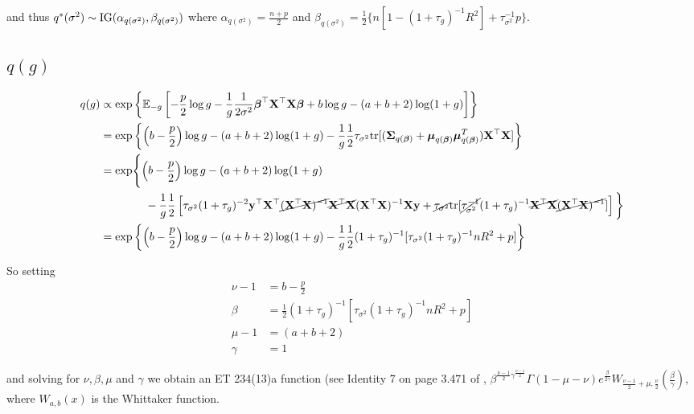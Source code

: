 \documentclass{amsart}[12pt]
\begin{document}
and thus $q^*(\sigma^2) \sim \text{IG}(\alpha_{q(\sigma^2)}, \beta_{q(\sigma^2)})$ where
$\alpha_{q(\sigma^2)} = \frac{n + p}{2}$ and $\beta_{q(\sigma^2)} = \frac{1}{2} \{n[1 - (1 + \tau_g)^{-1}  R^2] + \tau_{\sigma^2}^{-1} p \}$.

\subsection{$q(g)$}
\begin{align*}
q(g) &\propto \exp \left\{ \mathbb{E}_{-g} \left[-\frac{p}{2} \log g - \frac{1}{g} \frac{1}{2 \sigma^2} {\boldsymbol \beta}^\top {\bf X}^\top {\bf X} {\boldsymbol\beta} + b \log g - (a + b + 2) \log(1 + g) \right] \right\} \\
&= \exp \left \{ \left(b - \frac{p}{2}\right) \log g  - (a + b + 2) \log(1 + g) - \frac{1}{g} \frac{1}{2} \tau_{\sigma^2} \text{tr}[({\boldsymbol \Sigma}_{q({\boldsymbol \beta})} + {\boldsymbol \mu}_{q({\boldsymbol \beta})} {\boldsymbol \mu}_{q({\boldsymbol \beta})}^T) {\bf X}^\top {\bf X}] \right \} \\
&= \exp \Biggl \{ \left(b - \frac{p}{2}\right) \log g - (a + b + 2) \log(1 + g) \\
& \quad \quad \qquad  - \frac{1}{g} \frac{1}{2} \left[\tau_{\sigma^2} (1 + \tau_g)^{-2} {\bf y}^\top {\bf X}^\top \cancel{({\bf X}^\top {\bf X})^{-1}} \cancel{{\bf X}^\top {\bf X}} ({\bf X}^\top {\bf X})^{-1} {\bf X} {\bf y} + \cancel{\tau_{\sigma^2}} \text{tr}{[\cancel{\tau_{\sigma^2}^{-1}} (1 + \tau_g)^{-1} \cancel{{\bf X}^\top {\bf X}} \cancel{({\bf X}^\top {\bf X})^{-1}}]} \right]	\biggl \} \\
&= \exp \left \{ \left(b - \frac{p}{2}\right) \log g - (a + b + 2) \log(1 + g) - \frac{1}{g} \frac{1}{2} (1 + \tau_g)^{-1} [\tau_{\sigma^2} (1 + \tau_g)^{-1} n R^2 + p]
	  \right \}
\end{align*}

So setting
\begin{align*}
\nu - 1 &= b - \frac{p}{2} \\
\beta &= \frac{1}{2} (1 + \tau_g)^{-1} [\tau_{\sigma^2} (1 + \tau_g)^{-1} n R^2 + p] \\
\mu - 1 &= (a + b + 2) \\
\gamma &= 1
\end{align*}

and solving for $\nu, \beta, \mu$ and $\gamma$ we obtain an ET 234(13)a function (see Identity 7 on 
page 3.471 of \cite{Gradshteyn1988},
$\beta^{\frac{\nu - 1}{2} \gamma^{\frac{\nu - 1}{2}}} \Gamma(1 - \mu - \nu) e^{\frac{\beta}{2 \gamma}} W_{\frac{\nu - 1}{2} + \mu, \frac{\nu}{2}}\left(\frac{\beta}{\gamma}\right)$, where $W_{a, b}(x)$ is the
Whittaker function.
\end{document}
